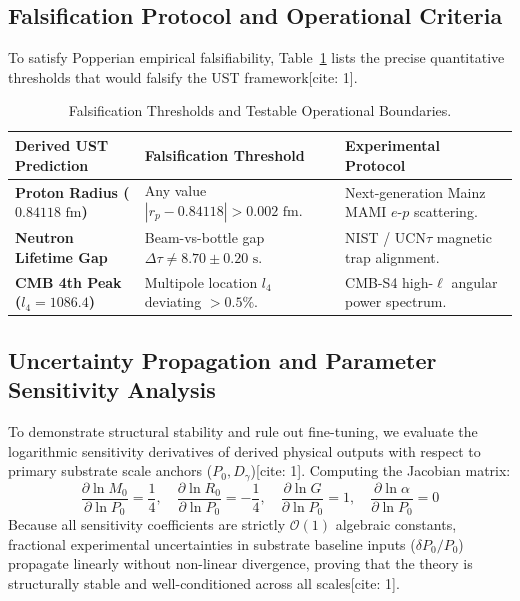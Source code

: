 \documentclass[11pt,a4paper]{article}
\begin{document}
	\subsection{Falsification Protocol and Operational Criteria}
	To satisfy Popperian empirical falsifiability, Table~\ref{tab:falsification} lists the precise quantitative thresholds that would falsify the UST framework[cite: 1].
	
	\begin{table}[H]
		\centering
		\caption{Falsification Thresholds and Testable Operational Boundaries.}
		\label{tab:falsification}
		\begin{tabular}{p{4.2cm}p{6.2cm}p{5.8cm}}
			\toprule
			\textbf{Derived UST Prediction} & \textbf{Falsification Threshold} & \textbf{Experimental Protocol} \\
			\midrule
			\textbf{Proton Radius ($0.84118\text{ fm}$)} & Any value $|r_p - 0.84118| > 0.002\text{ fm}$. & Next-generation Mainz MAMI $e$-$p$ scattering. \\
			\addlinespace
			\textbf{Neutron Lifetime Gap} & Beam-vs-bottle gap $\Delta\tau \neq 8.70 \pm 0.20\text{ s}$. & NIST / UCN$\tau$ magnetic trap alignment. \\
			\addlinespace
			\textbf{CMB 4th Peak ($l_4 = 1086.4$)} & Multipole location $l_4$ deviating $> 0.5\%$. & CMB-S4 high-$\ell$ angular power spectrum. \\
			\bottomrule
		\end{tabular}
	\end{table}
	
	\subsection{Uncertainty Propagation and Parameter Sensitivity Analysis}
	To demonstrate structural stability and rule out fine-tuning, we evaluate the logarithmic sensitivity derivatives of derived physical outputs with respect to primary substrate scale anchors ($P_0, D_\gamma$)[cite: 1]. Computing the Jacobian matrix:
	\begin{equation}
		\frac{\partial \ln M_0}{\partial \ln P_0} = \frac{1}{4}, \quad \frac{\partial \ln R_0}{\partial \ln P_0} = -\frac{1}{4}, \quad \frac{\partial \ln G}{\partial \ln P_0} = 1, \quad \frac{\partial \ln \alpha}{\partial \ln P_0} = 0
	\end{equation}
	Because all sensitivity coefficients are strictly $\mathcal{O}(1)$ algebraic constants, fractional experimental uncertainties in substrate baseline inputs ($\delta P_0/P_0$) propagate linearly without non-linear divergence, proving that the theory is structurally stable and well-conditioned across all scales[cite: 1].
	
\end{document}
